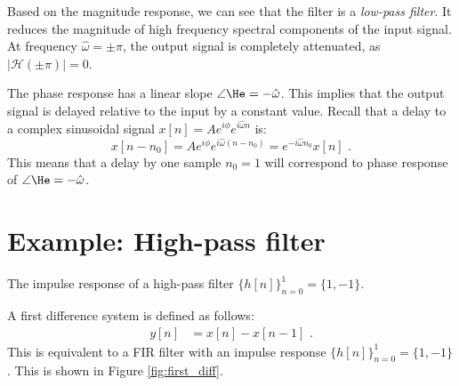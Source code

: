 Based on the magnitude response, we can see that the filter is
a \emph{low-pass filter}. It reduces the magnitude of high frequency
spectral components of the input signal. At frequency
$\hat{\omega}=\pm\pi$, the output signal is completely attenuated, as
$|\mathcal{H}(\pm \pi)|=0$.

The phase response has a linear slope $\angle \He =
-\hat{\omega}$. This implies that the output signal is delayed
relative to the input by a constant value. Recall that a delay to a
complex sinusoidal signal $x[n]=A e^{i\phi} e^{i\hat{\omega}n} $ is:
\begin{equation}
x[n-n_0] = A e^{i\phi} e^{i\hat{\omega} (n-n_0)} = e^{-i\hat{\omega}n_0}x[n] \,\,.
\end{equation}
This means that a delay by one sample $n_0=1$ will correspond to phase
response of $\angle \He = -\hat{\omega}$.


\section{Example: High-pass filter}
\begin{marginfigure}
\begin{center}
\end{center}
\caption{The impulse response of a high-pass filter $\{h[n]\}_{n=0}^{1}=\{1,-1\}$.}
\label{fig:first_diff}
\end{marginfigure}

A first difference system is defined as follows:
\begin{align}
y[n] & = x[n] - x[n-1] \,\,.
\end{align}
This is equivalent to a FIR filter with an impulse response
$\{h[n]\}_{n=0}^{1}=\{1,-1\}$. This is shown in Figure \ref{fig:first_diff}.

